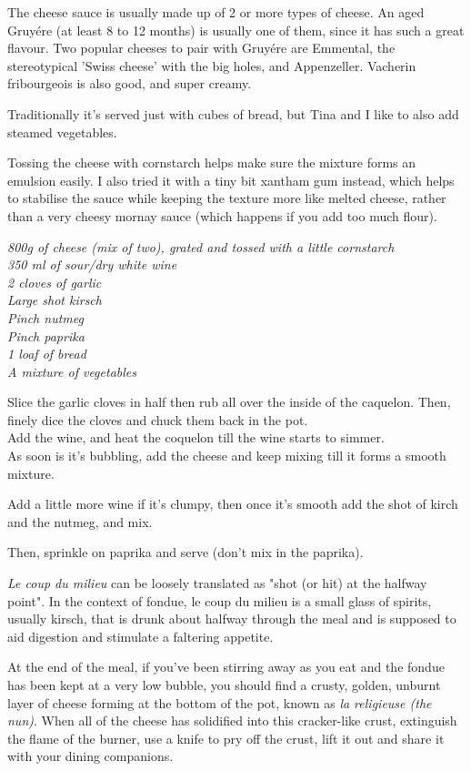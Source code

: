 \documentclass{tufte-book}
\begin{document}
The cheese sauce is usually made up of 2 or more types of cheese. An aged Gruy\'ere (at least 8 to 12 months) is usually one of them, since it has such a great flavour. Two popular cheeses to pair with Gruy\'ere are Emmental, the stereotypical 'Swiss cheese' with the big holes, and Appenzeller. Vacherin fribourgeois is also good, and super creamy.

Traditionally it's served just with cubes of bread, but Tina and I like to also add steamed vegetables.

Tossing the cheese with cornstarch helps make sure the mixture forms an emulsion easily. I also tried it with a tiny bit xantham gum instead, which helps to stabilise the sauce while keeping the texture more like melted cheese, rather than a very cheesy mornay sauce (which happens if you add too much flour).

\emph{800g of cheese (mix of two), grated and tossed with a little cornstarch
\\350 ml of sour/dry white wine
\\2 cloves of garlic
\\Large shot kirsch
\\Pinch nutmeg
\\Pinch paprika
\\1 loaf of bread
\\A mixture of vegetables
}

Slice the garlic cloves in half then rub all over the inside of the caquelon. Then, finely dice the cloves and chuck them back in the pot.
\\Add the wine, and heat the coquelon till the wine starts to simmer.
\\As soon is it's bubbling, add the cheese and keep mixing till it forms a smooth mixture. 

Add a little more wine if it's clumpy, then once it's smooth add the shot of kirch and the nutmeg, and mix. \

Then, sprinkle on paprika and serve (don't mix in the paprika).

\emph{Le coup du milieu} can be loosely translated as "shot (or hit) at the halfway point". In the context of fondue, le coup du milieu is a small glass of spirits, usually kirsch, that is drunk about halfway through the meal and is supposed to aid digestion and stimulate a faltering appetite.

At the end of the meal, if you've been stirring away as you eat and the fondue has been kept at a very low bubble, you should find a crusty, golden, unburnt layer of cheese forming at the bottom of the pot, known as \emph{la religieuse (the nun)}. When all of the cheese has solidified into this cracker-like crust, extinguish the flame of the burner, use a knife to pry off the crust, lift it out and share it with your dining companions.
\end{document}
